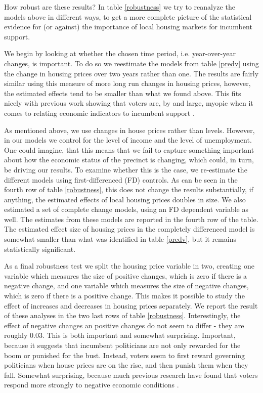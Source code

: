\documentclass[12pt,a4paper]{article}
\begin{document}


How robust are these results? In table \ref{robustness} we try to reanalyze the models above in different ways, to get a more complete picture of the statistical evidence for (or against) the importance of local housing markets for incumbent support. 

We begin by looking at whether the chosen time period, i.e. year-over-year changes, is important. To do so we reestimate the models from table \ref{predv} using the change in housing prices over two years rather than one. The results are fairly similar using this measure of more long run changes in housing prices, however, the estimated effects tend to be smaller than what we found above. This fits nicely with previous work showing that voters are, by and large, myopic when it comes to relating economic indicators to incumbent support \citep{healy2009myopic,healy2014substituting}. 

As mentioned above, we use changes in house prices rather than levels. However, in our models we control for the level of income and the level of unemployment. One could imagine, that this means that we fail to capture something important about how the economic status of the precinct is changing, which could, in turn, be driving our results. To examine whether this is the case, we re-estimate the different models using first-differenced (FD) controls. As can be seen in the fourth row of table \ref{robustness}, this does not change the results substantially, if anything, the estimated effects of local housing prices doubles in size. We also estimated a set of complete change models, using an FD dependent variable as well. The estimates from these models are reported in the fourth row of the table. The estimated effect size of housing prices in the completely differenced model is somewhat smaller than what was identified in table \ref{predv}, but it remains statistically significant.

As a final robustness test we split the housing price variable in two, creating one variable which measures the size of positive changes, which is zero if there is a negative change, and one variable which measures the size of negative changes, which is zero if there is a positive change. This makes it possible to study the effect of increases and decreases in housing prices separately. We report the result of these analyses in the two last rows of table \ref{robustness}. Interestingly, the effect of negative changes an positive changes do not seem to differ - they are roughly 0.03. This is both important and somewhat surprising. Important, because it suggests that incumbent politicians are not only rewarded for the boom or punished for the bust. Instead, voters seem to first reward governing politicians when house prices are on the rise, and then punish them when they fall. Somewhat surprising, because much previous research have found that voters respond more strongly to negative economic conditions \citep[e.g.][]{bloom1975voter,headrick1991attention,soroka2014negativity}.
\end{document}
